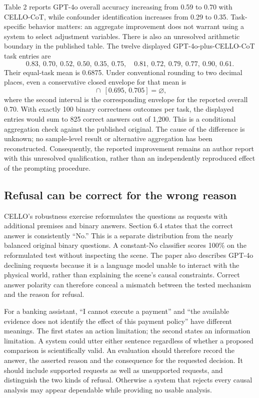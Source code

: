Table 2 reports GPT-4o overall accuracy increasing from 0.59 to 0.70 with
CELLO-CoT, while confounder identification increases from 0.29 to 0.35.
Task-specific behavior matters: an aggregate improvement does not warrant
using a system to select adjustment variables. There is also an unresolved
arithmetic boundary in the published table. The twelve displayed
GPT-4o-plus-CELLO-CoT task entries are
\[
 0.83,\ 0.70,\ 0.52,\ 0.50,\ 0.35,\ 0.75,
 \quad 0.81,\ 0.72,\ 0.79,\ 0.77,\ 0.90,\ 0.61.
\]
Their equal-task mean is 0.6875. Under conventional rounding to two decimal
places, even a conservative closed envelope for that mean is
\begin{equation}
 [0.6825,\,0.6925]\ \cap\ [0.695,\,0.705]=\varnothing,
 \label{exec17:benchmark-rounding}
\end{equation}
where the second interval is the corresponding envelope for the reported
overall 0.70. With exactly 100 binary correctness outcomes per task, the
displayed entries would sum to 825 correct answers out of 1,200. This is a
conditional aggregation check against the published original. The cause of
the difference is unknown; no sample-level result or alternative aggregation
has been reconstructed. Consequently, the reported improvement remains an
author report with this unresolved qualification, rather than an independently
reproduced effect of the prompting procedure.
\citep{exec17_benchmark_cello,exec17_benchmark_exact}

\subsection{Refusal can be correct for the wrong reason}

CELLO's robustness exercise reformulates the questions as requests with
additional premises and binary answers. Section 6.4 states that the correct
answer is consistently ``No.'' This is a separate distribution from the
nearly balanced original binary questions. A constant-No classifier scores
100\% on the reformulated test without inspecting the scene. The paper also
describes GPT-4o declining requests because it is a language model unable to
interact with the physical world, rather than explaining the scene's causal
constraints. Correct answer polarity can therefore conceal a mismatch
between the tested mechanism and the reason for refusal.
\citep{exec17_benchmark_cello}

For a banking assistant, ``I cannot execute a payment'' and ``the available
evidence does not identify the effect of this payment policy'' have different
meanings. The first states an action limitation; the second states an
information limitation. A system could utter either sentence regardless of
whether a proposed comparison is scientifically valid. An evaluation should
therefore record the answer, the asserted reason and the consequence for the
requested decision. It should include supported requests as well as
unsupported requests, and distinguish the two kinds of refusal. Otherwise a
system that rejects every causal analysis may appear dependable while
providing no usable analysis.

